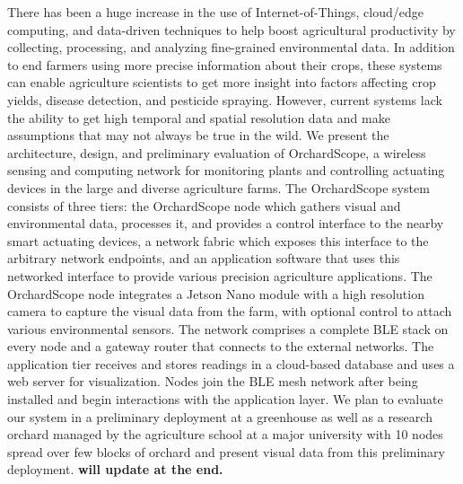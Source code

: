 There has been a huge increase in the use of Internet-of-Things, cloud/edge computing, and data-driven techniques to help boost agricultural productivity by collecting, processing, and analyzing fine-grained environmental data. 
In addition to end farmers using more precise information about their crops, these systems can enable agriculture scientists to get more insight into factors affecting crop yields, disease detection, and pesticide spraying. 
However, current systems lack the ability to get high temporal and spatial resolution data and make assumptions that may not always be true in the wild. 
We present the architecture, design, and preliminary evaluation of OrchardScope, a wireless sensing and computing network for monitoring plants and controlling actuating devices in the large and diverse agriculture farms. 
The OrchardScope system consists of three tiers:  the OrchardScope node which gathers visual and environmental data, processes it, and provides a control interface to the nearby smart actuating devices, a network fabric which exposes this interface to the arbitrary network endpoints, and an application software that uses this networked interface to provide various precision agriculture applications.  
The OrchardScope node integrates a Jetson Nano module with a high resolution camera to capture the visual data from the farm,  with optional control to attach various environmental sensors.  
The network comprises a complete BLE stack on every node and a gateway router that connects to the external networks.   
The application tier receives and stores readings in a cloud-based database and uses a web server for visualization. 
Nodes join the BLE mesh network after being installed and begin interactions with the application layer. 
We plan to evaluate our system in a preliminary deployment at a greenhouse as well as a research orchard managed by the agriculture school at a major university with 10 nodes spread over few blocks of orchard and present visual data from this preliminary deployment.
\textbf{will update at the end.}